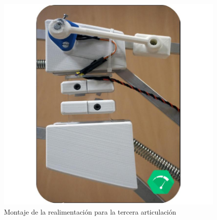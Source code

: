     \begin{minipage}{0.47\textwidth}\raggedright
        \begin{figure}[H]
            \centering
            \includegraphics[width=1.15\textwidth]{figuras/Imagenes_Electronica/foto_brazo_2.jpg}
            \caption{Montaje de la realimentación para la tercera articulación}
            \label{fig:Mecanica:realimentacion_2}
        \end{figure}
    \end{minipage}


